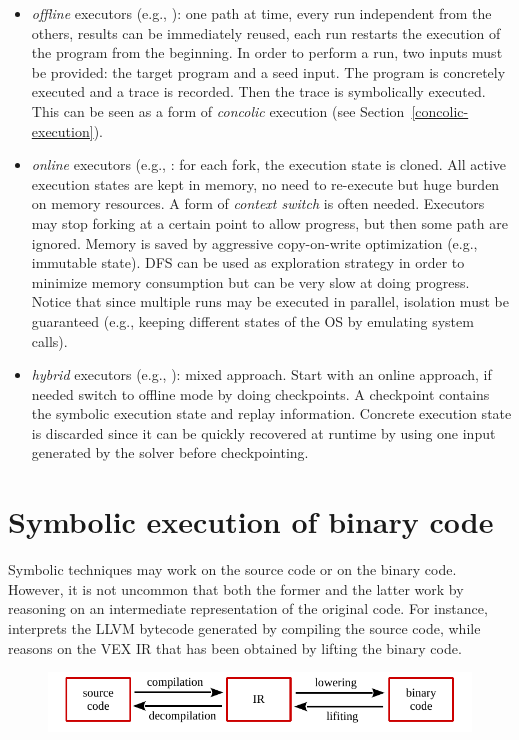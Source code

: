 \begin{itemize}
  \item {\em offline} executors (e.g., \cite{SAGE-NDSS08}): one path at time, every run independent from the others, results can be immediately reused, each run restarts the execution of the program from the beginning. In order to perform a run, two inputs must be provided: the target program and a seed input. The program is concretely executed and a trace is recorded. Then the trace is symbolically executed. This can be seen as a form of {\em concolic} execution (see Section~\ref{concolic-execution}).
  \item {\em online} executors (e.g., \cite{KLEE-OSDI08,CKC-TOCS12,AEG-NDSS11}: for each fork, the execution state is cloned. All active execution states are kept in memory, no need to re-execute but huge burden on memory resources. A form of {\em context switch} is often needed. Executors may stop forking at a certain point to allow progress, but then some path are ignored. Memory is saved by aggressive copy-on-write optimization (e.g., immutable state). DFS can be used as exploration strategy in order to minimize memory consumption but can be very slow at doing progress. Notice that since multiple runs may be executed in parallel, isolation must be guaranteed (e.g., keeping different states of the OS by emulating system calls).
  \item {\em hybrid} executors (e.g., \cite{MAYHEM-SP12}): mixed approach. Start with an online approach, if needed switch to offline mode by doing checkpoints. A checkpoint contains the symbolic execution state and replay information. Concrete execution state is discarded since it can be quickly recovered at runtime by using one input generated by the solver before checkpointing.
\end{itemize}






\section{Symbolic execution of binary code}

Symbolic techniques may work on the source code or on the binary code. However, it is not uncommon that both the former and the latter work by reasoning on an intermediate representation of the original code. For instance, ~\cite{KLEE-OSDI08} interprets the LLVM bytecode generated by compiling the source code, while~\cite{ANGR-SP16} reasons on the VEX IR that has been obtained by lifting the binary code.

\begin{figure}[h!]
  \centering
  \includegraphics[width=.7\columnwidth]{images/compiler} 
\end{figure}


